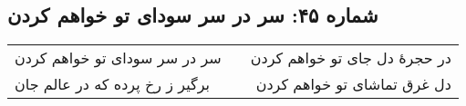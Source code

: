 \begin{center}
\section*{شماره ۴۵: سر در سر سودای تو خواهم کردن}
\label{sec:045}
\begin{longtable}{l p{0.5cm} r}
سر در سر سودای تو خواهم کردن
&&
در حجرهٔ دل جای تو خواهم کردن
\\
برگیر ز رخ پرده که در عالم جان
&&
دل غرق تماشای تو خواهم کردن
\\
\end{longtable}
\end{center}
